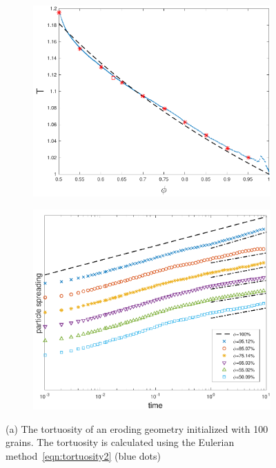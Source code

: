 \documentclass{jfm}
\begin{document}
\begin{figure}
\begin{subfigure}[b]{0.5\textwidth}
\includegraphics*[height = 0.8\linewidth]{./figs/tort_eulerian100}
\caption{}
\end{subfigure}
\begin{subfigure}[b]{0.5\textwidth}
\includegraphics*[height=0.8\linewidth]{./figs/100b_second_moment_long_ref}
\caption{}
\end{subfigure}
\caption{\label{fig:Eroding100Transport} (a) The tortuosity of an
eroding geometry initialized with 100 grains.  The tortuosity is
calculated using the Eulerian method~\eqref{eqn:tortuosity2} (blue dots)
}
\end{figure}
\end{document}
